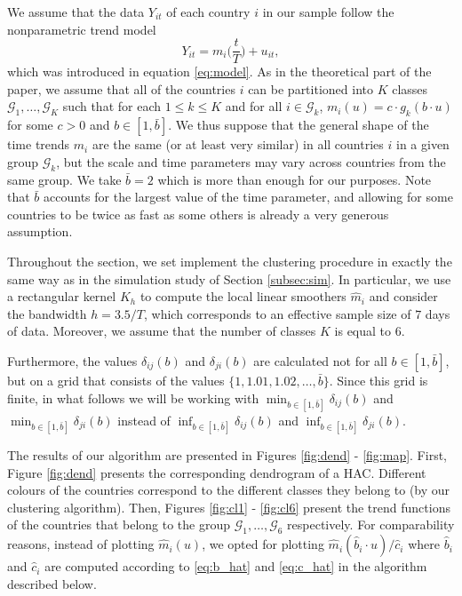 \documentclass[a4paper,11pt]{article}
\numberwithin{equation}{section}
\begin{document}
We assume that the data $Y_{it}$ of each country $i$ in our sample follow the nonparametric trend model 
\[ Y_{it} = m_i\Big(\frac{t}{T}\Big) + u_{it}, \]
which was introduced in equation \eqref{eq:model}. As in the theoretical part of the paper, we assume that all of the countries $i$ can be partitioned into $K$ classes $\mathcal{G}_1, \ldots, \mathcal{G}_K$ such that for each $1 \leq k\leq K$ and for all $i \in \mathcal{G}_k$, $m_i(u) = c \cdot g_k(b \cdot u)$ for some $c>0$ and $b\in[1, \bar{b}]$. We thus suppose that the general shape of the time trends $m_i$ are the same (or at least very similar) in all countries $i$ in a given group $\mathcal{G}_k$, but the scale and time parameters may vary across countries from the same group. We take $\bar{b} = 2$ which is more than enough for our purposes. Note that $\bar{b}$ accounts for the largest value of the time parameter, and allowing for some countries to be twice as fast as some others is already a very generous assumption.

Throughout the section, we set implement the clustering procedure in exactly the same way as in the simulation study of Section \ref{subsec:sim}. In particular, we use a rectangular kernel $K_h$ to compute the local linear smoothers $\hat{m}_{i}$ and consider the bandwidth $h = 3.5/T$, which corresponds to an effective sample size of $7$ days of data. Moreover, we assume that the number of classes $K$ is equal to $6$.

Furthermore, the values $\delta_{ij}(b)$ and $\delta_{ji}(b)$ are calculated not for all $b\in [1, \bar{b}]$, but on a grid that consists of the values $\{1, 1.01, 1.02, \ldots, \bar{b}\}$. Since this grid is finite, in what follows we will be working with $\min_{b \in [1, \bar{b}]} \delta_{ij}(b)$ and $\min_{b \in [1, \bar{b}]} \delta_{ji}(b)$ instead of $\inf_{b \in [1, \bar{b}]} \delta_{ij}(b)$ and $\inf_{b \in [1, \bar{b}]} \delta_{ji}(b)$.

The results of our algorithm are presented in Figures \ref{fig:dend} - \ref{fig:map}. First, Figure \ref{fig:dend} presents the corresponding dendrogram of a HAC. Different colours of the countries correspond to the different classes they belong to (by our clustering algorithm). Then, Figures \ref{fig:cl1} - \ref{fig:cl6} present the trend functions of the countries that belong to the group $\mathcal{G}_1, \ldots, \mathcal{G}_6$ respectively. For comparability reasons, instead of plotting $\hat{m}_i(u)$, we opted for plotting $\hat{m}_i(\hat{b}_i \cdot u) / \hat{c}_i$ where $\hat{b}_i$ and $\hat{c}_i$ are computed according to \eqref{eq:b_hat} and \eqref{eq:c_hat} in the algorithm described below.
\end{document}
